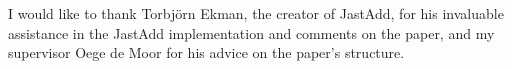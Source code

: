 I would like to thank Torbj\"{o}rn Ekman, the creator of JastAdd, for 
his invaluable assistance in the JastAdd implementation and comments on the paper, 
and my supervisor Oege de Moor for his advice on the paper's structure.